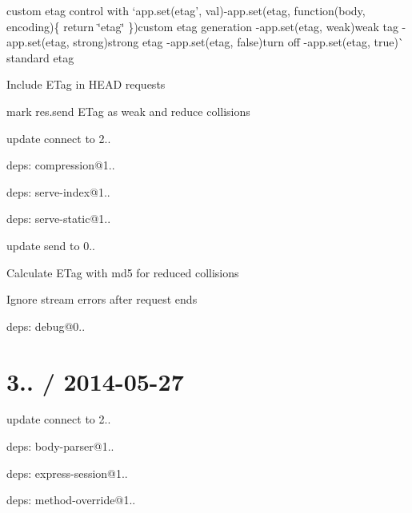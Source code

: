 {\ttfamily 
\begin{DoxyItemize}
\item custom etag control with `app.\+set(\textquotesingle{}etag', val){\ttfamily  -\/}app.\+set(\textquotesingle{}etag\textquotesingle{}, function(body, encoding)\{ return \textquotesingle{}\char`\"{}etag\char`\"{}\textquotesingle{} \}){\ttfamily custom etag generation -\/}app.\+set(\textquotesingle{}etag\textquotesingle{}, \textquotesingle{}weak\textquotesingle{}){\ttfamily weak tag -\/}app.\+set(\textquotesingle{}etag\textquotesingle{}, \textquotesingle{}strong\textquotesingle{}){\ttfamily strong etag -\/}app.\+set(\textquotesingle{}etag\textquotesingle{}, false){\ttfamily turn off -\/}app.\+set(\textquotesingle{}etag\textquotesingle{}, true)\`{} standard etag
\item Include E\+Tag in H\+E\+AD requests
\item mark {\ttfamily res.\+send} E\+Tag as weak and reduce collisions
\item update connect to 2..
\begin{DoxyItemize}
\item deps\+: compression@1..
\item deps\+: serve-\/index@1..
\item deps\+: serve-\/static@1..
\end{DoxyItemize}
\item update send to 0..
\begin{DoxyItemize}
\item Calculate E\+Tag with md5 for reduced collisions
\item Ignore stream errors after request ends
\item deps\+: debug@0..
\end{DoxyItemize}
\end{DoxyItemize}}

{\ttfamily \section*{3.. / 2014-\/05-\/27 }}

{\ttfamily }

{\ttfamily 
\begin{DoxyItemize}
\item update connect to 2..
\begin{DoxyItemize}
\item deps\+: body-\/parser@1..
\item deps\+: express-\/session@1..
\item deps\+: method-\/override@1..
\end{DoxyItemize}
\end{DoxyItemize}}

